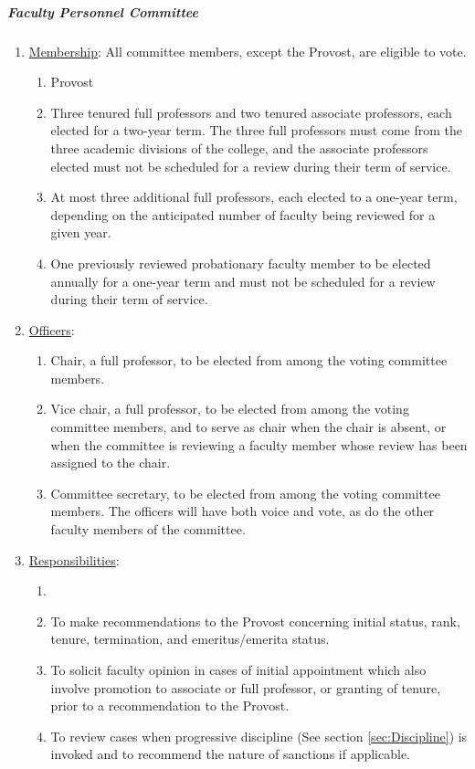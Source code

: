 				\subparagraph{Faculty Personnel Committee}
					\begin{enumerate}[label=\alph*)]
						\item{\underline{Membership}:
							All committee members, except the Provost, are eligible to vote.
							\begin{enumerate}[label=\arabic*)]
								\item{Provost}
								\item{Three tenured full professors and two tenured associate professors, each elected for a two-year term.  The three full professors must come from the three academic divisions of the college, and the associate professors elected must not be scheduled for a review during their term of service.}
								\item{At most three additional full professors, each elected to a one-year term, depending on the anticipated number of faculty being reviewed for a given year.}
								\item{One previously reviewed probationary faculty member to be elected annually for a one-year term and must not be scheduled for a review during their term of service.}

							\end{enumerate}
						}
						\item{\underline{Officers}:
							\begin{enumerate}[label=\arabic*)]
								\item{Chair, a full professor, to be elected from among the voting committee members.}
								\item{Vice chair, a full professor, to be elected from among the voting committee members, and to serve as chair when the chair is absent, or when the committee is reviewing a faculty member whose review has been assigned to the chair.}
								\item{Committee secretary, to be elected from among the voting committee members.  The officers will have both voice and vote, as do the other faculty members of the committee.}
							\end{enumerate}
						}
						\item{\underline{Responsibilities}:
							\begin{enumerate}[label=\arabic*)]
								\item{}
								\item{To make recommendations to the Provost concerning initial status, rank, tenure, termination, and emeritus/emerita status.}
								\item{To solicit faculty opinion in cases of initial appointment which also involve promotion to associate or full professor, or granting of tenure, prior to a recommendation to the Provost.}
								\item{To review cases when progressive discipline (See section \ref{sec:Discipline}) is invoked and to recommend the nature of sanctions if applicable.}
							\end{enumerate}
						}
					\end{enumerate}
